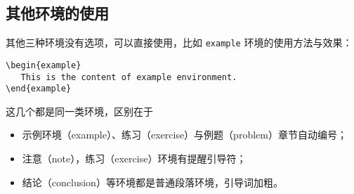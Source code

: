 \documentclass[cn,10pt,math=newtx,citestyle=gb7714-2015,bibstyle=gb7714-2015]{elegantbook}
\begin{document}
 

\subsection{其他环境的使用}

其他三种环境没有选项，可以直接使用，比如 \lstinline{example} 环境的使用方法与效果：
\begin{lstlisting}
\begin{example}
   This is the content of example environment.
\end{example}
\end{lstlisting}

这几个都是同一类环境，区别在于

\begin{itemize}
  \item 示例环境（example）、练习（exercise）与例题（problem）章节自动编号；
  \item 注意（note），练习（exercise）环境有提醒引导符；
  \item 结论（conclusion）等环境都是普通段落环境，引导词加粗。
\end{itemize}
\end{document}
